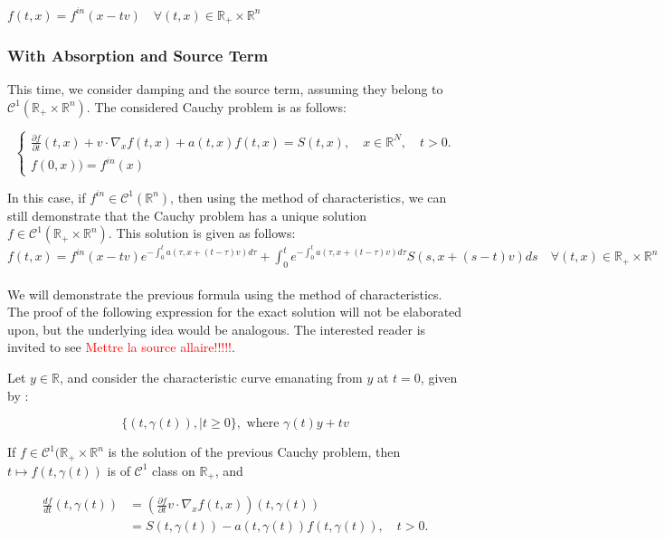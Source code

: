 \documentclass[onecolumn, 12pt, a4paper]{article}
\begin{document}
$\boxed{f(t,x)=f^{in}(x-tv) \quad \forall (t,x) \in \mathbb{R}_+ \times \mathbb{R}^n }$




\subsubsection{With Absorption and Source Term}

This time, we consider damping and the source term, assuming they belong to $\mathcal{C}^1(\mathbb{R}_+ \times \mathbb{R}^n)$. The considered Cauchy problem is as follows:

	
\[
\begin{cases}
\frac{\partial f}{\partial t}(t,x)+v \cdot \nabla_x f(t,x) + a(t,x)f(t,x) = S(t,x), \quad x \in \mathbb{R}^N, \quad t>0.\\
f(0,x)) = f^{in}(x)
\end{cases}
\]

In this case, if $f^{in} \in \mathcal{C}^1(\mathbb{R}^n)$, then using the method of characteristics, we can still demonstrate that the Cauchy problem has a unique solution $f \in \mathcal{C}^1(\mathbb{R}_+ \times \mathbb{R}^n)$. This solution is given as follows:\\
$\boxed{f(t,x)=f^{in}(x-tv) e^{-\int_0 ^t a(\tau,x+(t-\tau)v)d\tau} + \int_0 ^t  e^{-\int_0 ^t a(\tau,x+(t-\tau)v)d\tau} S(s,x+(s-t)v)ds \quad \forall (t,x) \in \mathbb{R}_+ \times \mathbb{R}^n }$

\paragraph{}

We will demonstrate the previous formula using the method of characteristics. The proof of the following expression for the exact solution will not be elaborated upon, but the underlying idea would be analogous. The interested reader is invited to see \textcolor{red}{Mettre la source allaire!!!!!}.

Let $y \in \mathbb{R}$, and consider the characteristic curve emanating from $y$ at $t=0$, given by :

\[ \{(t,\gamma(t)), | t\geq 0\} , \text{ where } \gamma (t) 	y+tv\]

If $f \in \mathcal{C}^1(\mathbb{R}_+ \times \mathbb{R}^n$ is the solution of the previous Cauchy problem, then $t \mapsto f(t,\gamma(t))$ is of $\mathcal{C}^1$ class on $\mathbb{R}_+$, and 


\[
\begin{aligned}
\frac{d f}{d t}(t,\gamma(t))&=(\frac{\partial f}{\partial t}
v \cdot \nabla_x f(t,x))(t,\gamma(t)) \\ &= S(t,\gamma(t))-a(t,\gamma(t))f(t,\gamma(t)), \quad t>0.
\end{aligned}
\]
\end{document}
